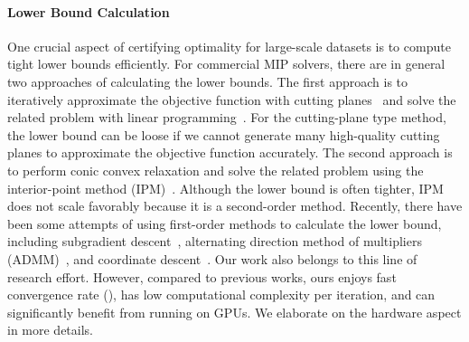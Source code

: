 \paragraph{Lower Bound Calculation}
One crucial aspect of certifying optimality for large-scale datasets is to compute tight lower bounds efficiently.
For commercial MIP solvers, there are in general two approaches of calculating the lower bounds.
The first approach is to iteratively approximate the objective function with cutting planes~\cite{kelley1960cutting} and solve the related problem with linear programming~\cite{schrijver1998theory, wolsey2020integer}.
For the cutting-plane type method, the lower bound can be loose if we cannot generate many high-quality cutting planes to approximate the objective function accurately.
The second approach is to perform conic convex relaxation and solve the related problem using the interior-point method (IPM)~\cite{dikin1967iterative, renegar2001mathematical, nesterov1994interior}.
Although the lower bound is often tighter, IPM does not scale favorably because it is a second-order method.
Recently, there have been some attempts of using first-order methods to calculate the lower bound, including subgradient descent~\cite{bertsimas2020sparse1}, alternating direction method of multipliers (ADMM)~\cite{liu2024okridge}, and coordinate descent~\cite{hazimeh2022sparse}.
Our work also belongs to this line of research effort.
However, compared to previous works, ours enjoys fast convergence rate (), has low computational complexity per iteration, and can significantly benefit from running on GPUs.
We elaborate on the hardware aspect in more details.




